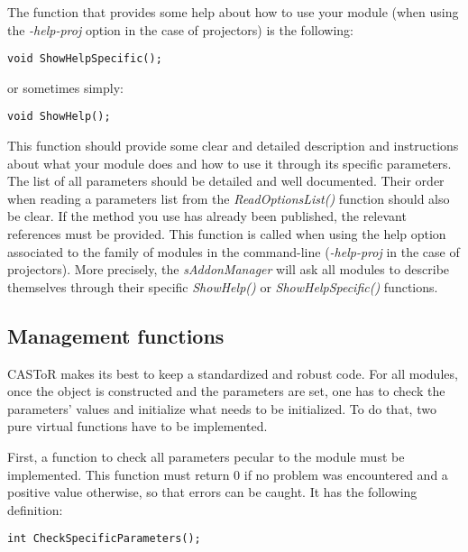 \documentclass[a4paper, 11pt]{article}
\begin{document}
The function that provides some help about how to use your module (when using the \textit{-help-proj} option in the case of projectors) is the following:
\begin{lstlisting}[label={ShowHelpSpecific},caption=Function to give specific help on how to use your module.]
void ShowHelpSpecific();
\end{lstlisting}
or sometimes simply:
\begin{lstlisting}[label={ShowHelp},caption=Function to give specific help on how to use your module.]
void ShowHelp();
\end{lstlisting}

This function should provide some clear and detailed description and instructions about what your module does and how to use it through its specific parameters.
The list of all parameters should be detailed and well documented.
Their order when reading a parameters list from the \textit{ReadOptionsList()} function should also be clear.
If the method you use has already been published, the relevant references must be provided.
This function is called when using the help option associated to the family of modules in the command-line (\textit{-help-proj} in the case of projectors).
More precisely, the \textit{sAddonManager} will ask all modules to describe themselves through their specific \textit{ShowHelp()} or \textit{ShowHelpSpecific()} functions.

\subsection{Management functions}

CASToR makes its best to keep a standardized and robust code.
For all modules, once the object is constructed and the parameters are set, one has to check the parameters' values and initialize what needs to be initialized.
To do that, two pure virtual functions have to be implemented.

First, a function to check all parameters pecular to the module must be implemented.
This function must return 0 if no problem was encountered and a positive value otherwise, so that errors can be caught.
It has the following definition:
\begin{lstlisting}[label={CheckSpecificParameters},caption=Function to check the value of all parameters pecular to your module.]
int CheckSpecificParameters();
\end{lstlisting}
\end{document}
